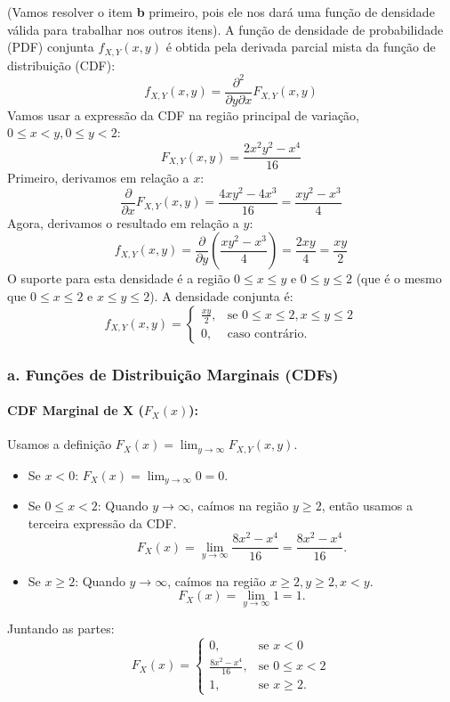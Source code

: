 \documentclass[12pt]{article}
\begin{document}
(Vamos resolver o item \textbf{b} primeiro, pois ele nos dará uma função de densidade válida para trabalhar nos outros itens).
A função de densidade de probabilidade (PDF) conjunta $f_{X,Y}(x,y)$ é obtida pela derivada parcial mista da função de distribuição (CDF):
\[ f_{X,Y}(x,y) = \frac{\partial^2}{\partial y \partial x} F_{X,Y}(x,y) \]
Vamos usar a expressão da CDF na região principal de variação, $0 \le x < y, 0 \le y < 2$:
\[ F_{X,Y}(x,y) = \frac{2x^2y^2-x^4}{16} \]
Primeiro, derivamos em relação a $x$:
\[ \frac{\partial}{\partial x} F_{X,Y}(x,y) = \frac{4xy^2 - 4x^3}{16} = \frac{xy^2 - x^3}{4} \]
Agora, derivamos o resultado em relação a $y$:
\[ f_{X,Y}(x,y) = \frac{\partial}{\partial y} \left( \frac{xy^2 - x^3}{4} \right) = \frac{2xy}{4} = \frac{xy}{2} \]
O suporte para esta densidade é a região $0 \le x \le y$ e $0 \le y \le 2$ (que é o mesmo que $0 \le x \le 2$ e $x \le y \le 2$). A densidade conjunta é:
\[ f_{X,Y}(x,y) = \begin{cases} \frac{xy}{2}, & \text{se } 0 \le x \le 2, x \le y \le 2 \\ 0, & \text{caso contrário.} \end{cases} \]

\subsubsection*{a. Funções de Distribuição Marginais (CDFs)}

\paragraph{CDF Marginal de X ($F_X(x)$):}
Usamos a definição $F_X(x) = \lim_{y\to\infty} F_{X,Y}(x,y)$.
\begin{itemize}
    \item Se $x < 0$: $F_X(x) = \lim_{y\to\infty} 0 = 0$.
    \item Se $0 \le x < 2$: Quando $y \to \infty$, caímos na região $y \ge 2$, então usamos a terceira expressão da CDF.
    \[ F_X(x) = \lim_{y\to\infty} \frac{8x^2-x^4}{16} = \frac{8x^2-x^4}{16}. \]
    \item Se $x \ge 2$: Quando $y \to \infty$, caímos na região $x \ge 2, y \ge 2, x < y$.
    \[ F_X(x) = \lim_{y\to\infty} 1 = 1. \]
\end{itemize}
Juntando as partes:
\[ F_X(x) = \begin{cases} 0, & \text{se } x < 0 \\ \frac{8x^2-x^4}{16}, & \text{se } 0 \le x < 2 \\ 1, & \text{se } x \ge 2. \end{cases} \]
\end{document}
